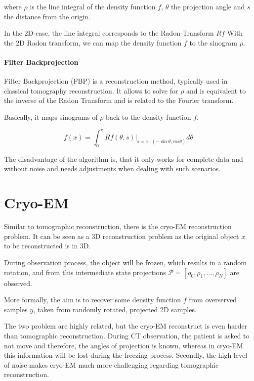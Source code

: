 where $\rho$ is the line integral of the density function $f$, $\theta$ the projection angle and $s$ the distance from the origin.

In the 2D case, the line integral corresponds to the Radon-Transform $Rf$
With the 2D Radon transform, we can map the density function $f$ to the sinogram $\rho$. 

\paragraph{Filter Backprojection}
\label{sec:filterBackProjection}
Filter Backprojection (FBP) is a reconstruction method, typically used in classical tomography reconstruction.
It allows to solve for $\rho$ and is equivalent to the inverse of the Radon Transform
and is related to the Fourier transform. 

Basically, it maps sinograms of $\rho$ back to the density function $f$.

\begin{equation}
    f(x) = \int_{0}^{\pi} Rf(\theta, s) |_{s=x \cdot (- \sin \theta, cos \theta) } d \theta
\end{equation}

The disadvantage of the algorithm is, that it only works for complete data and without noise
and needs adjustments when dealing with such scenarios. 


\section{Cryo-EM}
Similar to tomographic reconstruction, there is the cryo-EM reconstruction problem\cite{cryoEmMath}.
It can be seen as a 3D reconstruction problem as the original object $x$ to be reconstructed is in 3D.

During observation process, the object will be frozen, which results in a random rotation, and from this intermediate state 
projections $\mathcal{P}=[\rho_0, \rho_1, \dots, \rho_N]$ are observed.

More formally, the aim is to recover some density function $f$ from overserved samples $y$, taken from 
randomly rotated, projected 2D samples.

The two problem are highly related, but the cryo-EM reconstruct is even harder than tomographic reconstruction.
During CT observation, the patient is asked to not move and therefore, the angles of projection is known, whereas
in cryo-EM this information will be lost during the freezing process.
Secondly, the high level of noise makes cryo-EM much more challenging regarding tomographic reconstruction.

